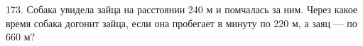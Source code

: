 173. Собака увидела зайца на расстоянии 240 м и помчалась за ним. Через какое время собака догонит зайца, если она пробегает в минуту по 220 м, а заяц --- по 660 м?\\
